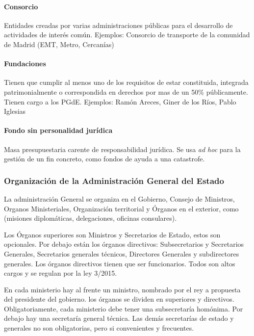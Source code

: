     \paragraph{Consorcio} Entidades creadas por varias administraciones públicas para el desarrollo de actividades de interés común. Ejemplos: Consorcio de transporte de la comunidad de Madrid (EMT, Metro, Cercanías)

    \paragraph{Fundaciones}
        Tienen que cumplir al menos uno de los requisitos de estar constituida, integrada patrimonialmente o correspondida en derechos por mas de un 50\% públicamente. Tienen cargo a los PGdE. Ejemplos: Ramón Areces, Giner de los Ríos, Pablo Iglesias

    \paragraph{Fondo sin personalidad jurídica}
        Masa presupuestaria carente de responsabilidad jurídica. Se usa \textit{ad hoc} para la gestión de un fin concreto, como fondos de ayuda a una catastrofe.

\subsubsection{Organización de la Administración General del Estado}
    La administración General se organiza en el Gobierno, Consejo de Ministros, Organos Ministeriales, Organización territorial y Órganos en el exterior, como (misiones diplomáticas, delegaciones, oficinas consulares).

    Los Órganos superiores son Ministros y Secretarios de Estado, estos son opcionales. Por debajo están los órganos directivos: Subsecretarios y Secretarios Generales, Secretarios generales técnicos, Directores Generales y subdirectores generales. Los órganos directivos tienen que ser funcionarios. Todos son altos cargos y se regulan por la ley 3/2015.

    En cada ministerio hay al frente un ministro, nombrado por el rey a propuesta del presidente del gobierno. los órganos se dividen en superiores y directivos. Obligatoriamente, cada ministerio debe tener una subsecretaría homónima. Por debajo hay una secretaría general técnica. Las demás secretarías de estado y generales no son obligatorias, pero si convenientes y frecuentes.

